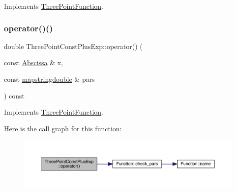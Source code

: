 Implements \mbox{\hyperlink{classThreePointFunction_a4231093b53df2f82f4821a663ac8249f}{Three\+Point\+Function}}.

\mbox{\label{classThreePointConstPlusExp_aabb955a37221d2dc9cff3528a1564584}} 
\subsubsection{\texorpdfstring{operator()()}{operator()()}\hspace{0.1cm}{\footnotesize\ttfamily [1/2]}}
{\footnotesize\ttfamily double Three\+Point\+Const\+Plus\+Exp\+::operator() (\begin{DoxyParamCaption}\item[{const \mbox{\hyperlink{classAbscissa}{Abscissa}} \&}]{x,  }\item[{const \mbox{\hyperlink{lib_2fitting__lib_2includes_8h_a647b481c557c7966517f753340a81d13}{mapstringdouble}} \&}]{pars }\end{DoxyParamCaption}) const\hspace{0.3cm}{\ttfamily [virtual]}}



Implements \mbox{\hyperlink{classThreePointFunction_a02550dd7bdee83aab6967d304bb40ff1}{Three\+Point\+Function}}.

Here is the call graph for this function\+:
\nopagebreak
\begin{figure}[H]
\begin{center}
\leavevmode
\includegraphics[width=350pt]{d6/d9b/classThreePointConstPlusExp_aabb955a37221d2dc9cff3528a1564584_cgraph}
\end{center}
\end{figure}
\mbox{\label{classThreePointConstPlusExp_abe81611888105afdb0014bc1b9c2c269}} 
